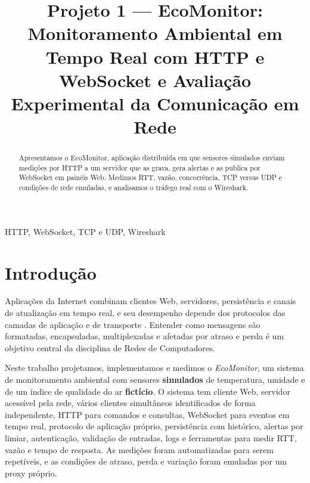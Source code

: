 \documentclass[conference]{IEEEtran}
\begin{document}
\title{Projeto 1 --- EcoMonitor: Monitoramento Ambiental em Tempo Real com HTTP e WebSocket e Avaliação Experimental da Comunicação em Rede}

\author{
}

\maketitle

\begin{abstract}
Apresentamos o EcoMonitor, aplicação distribuída em que sensores simulados enviam medições por HTTP a um servidor que as grava, gera alertas e as publica por WebSocket em painéis Web. Medimos RTT, vazão, concorrência, TCP versus UDP e condições de rede emuladas, e analisamos o tráfego real com o Wireshark.
\end{abstract}

\begin{IEEEkeywords}
HTTP, WebSocket, TCP e UDP, Wireshark
\end{IEEEkeywords}

\section{Introdução}
Aplicações da Internet combinam clientes Web, servidores, persistência e canais de atualização em tempo real, e seu desempenho depende dos protocolos das camadas de aplicação e de transporte \cite{kurose}. Entender como mensagens são formatadas, encapsuladas, multiplexadas e afetadas por atraso e perda é um objetivo central da disciplina de Redes de Computadores.

Neste trabalho projetamos, implementamos e medimos o \emph{EcoMonitor}, um sistema de monitoramento ambiental com sensores \textbf{simulados} de temperatura, umidade e de um índice de qualidade do ar \textbf{fictício}. O sistema tem cliente Web, servidor acessível pela rede, vários clientes simultâneos identificados de forma independente, HTTP para comandos e consultas, WebSocket para eventos em tempo real, protocolo de aplicação próprio, persistência com histórico, alertas por limiar, autenticação, validação de entradas, logs e ferramentas para medir RTT, vazão e tempo de resposta. As medições foram automatizadas para serem repetíveis, e as condições de atraso, perda e variação foram emuladas por um proxy próprio.
\end{document}
